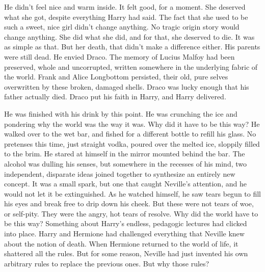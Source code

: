
He didn’t feel nice and warm inside. It felt good, for a moment. She deserved what she got, despite everything Harry had said. The fact that she used to be such a sweet, nice girl didn’t change anything. No tragic origin story would change anything. She did what she did, and for that, she deserved to die. It was as simple as that. But her death, that didn’t make a difference either.
\SmallVSpace
His parents were still dead.
\SmallVSpace
He envied Draco. The memory of Lucius Malfoy had been preserved, whole and uncorrupted, written somewhere in the underlying fabric of the world. Frank and Alice Longbottom persisted, their old, pure selves overwritten by these broken, damaged shells. Draco was lucky enough that his father actually died. Draco put his faith in Harry, and Harry delivered.


He was finished with his drink by this point. He was crunching the ice and pondering why the world was the way it was. Why did it have to be this way? He walked over to the wet bar, and fished for a different bottle to refill his glass. No pretenses this time, just straight vodka, poured over the melted ice, sloppily filled to the brim. He stared at himself in the mirror mounted behind the bar.
\SmallVSpace
The alcohol was dulling his senses, but somewhere in the recesses of his mind, two independent, disparate ideas joined together to synthesize an entirely new concept. It was a small spark, but one that caught Neville’s attention, and he would not let it be extinguished. As he watched himself, he saw tears begun to fill his eyes and break free to drip down his cheek. But these were not tears of woe, or self-pity. They were the angry, hot tears of resolve.
\SmallVSpace
Why did the world have to be this way?
\SmallVSpace
Something about Harry’s endless, pedagogic lectures had clicked into place. Harry and Hermione had challenged everything that Neville knew about the notion of death. When Hermione returned to the world of life, it shattered all the rules. But for some reason, Neville had just invented his own arbitrary rules to replace the previous ones. But why those rules?

